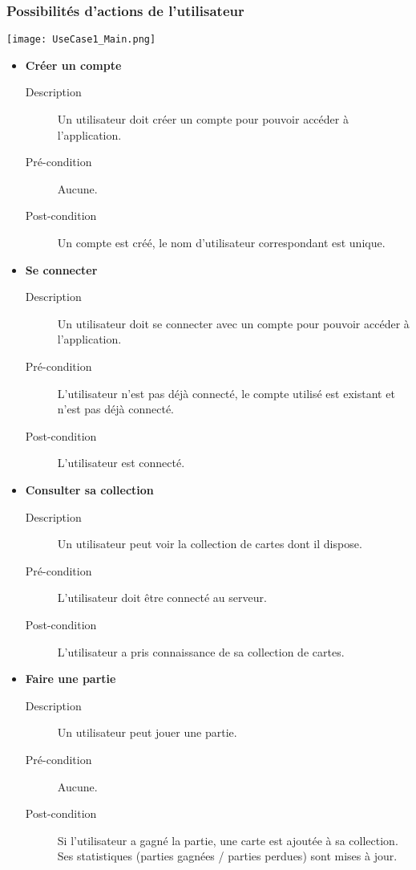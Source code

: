 \documentclass[12pt]{article}
\begin{document}
		\subsubsection{Possibilités d'actions de l'utilisateur}
			\begin{center}\texttt{[image: UseCase1\_Main.png]}\end{center}
			\begin{itemize}
				\item \textbf{Créer un compte}
				\begin{description}
					\item[Description] Un utilisateur doit créer un compte pour pouvoir accéder à l'application.
					\item[Pré-condition] Aucune.
					\item[Post-condition] Un compte est créé, le nom d'utilisateur correspondant est unique.\\
				\end{description}

				\item \textbf{Se connecter}
				\begin{description}
					\item[Description] Un utilisateur doit se connecter avec un compte pour pouvoir accéder à l'application.
					\item[Pré-condition] L'utilisateur n'est pas déjà connecté, le compte utilisé est existant et n'est pas déjà connecté.
					\item[Post-condition] L'utilisateur est connecté.\\
				\end{description}

				\item \textbf{Consulter sa collection}
				\begin{description}
					\item[Description] Un utilisateur peut voir la collection de cartes dont il dispose.
					\item[Pré-condition] L'utilisateur doit être connecté au serveur.
					\item[Post-condition] L'utilisateur a pris connaissance de sa collection de cartes.\\
				\end{description}

				\item \textbf{Faire une partie}
				\begin{description}
					\item[Description] Un utilisateur peut jouer une partie.
					\item[Pré-condition] Aucune.
					\item[Post-condition] Si l'utilisateur a gagné la partie, une carte est ajoutée à sa collection.
					Ses statistiques (parties gagnées / parties perdues) sont mises à jour.\\
				\end{description}


\end{itemize}
\end{document}
